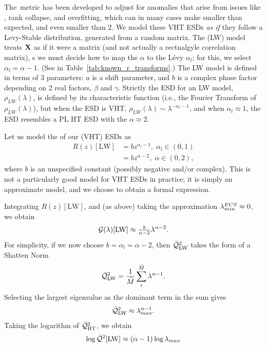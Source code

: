 The~\ALPHAHAT metric has been developed to adjust for \SCALE anomalies that arise from issues like \CorrelationTraps,
rank collapse, and overfitting, which can in many cases make \ALPHA smaller than expected, and even smaller than $2$.
We model these VHT ESDs \emph{as if} they follow a Levy-Stable distribution, generated from a \LevyWigner random matrix.
The \LevyWigner (LW) model treats $\mathbf{X}$ as if it were a \Wigner matrix (and not actually a rectnalgyle correlation  matrix),
s we must decide how to map the \HTSR $\alpha$ to the L\'evy $\alpha_{l}$; for this, we select $\alpha_{l}=\alpha-1$.
(See in Table~\ref{tab:known_r_transforms}.)
The LW model is defined in terms of 3 parameters:
$a$ is a shift parameter, and $b$ is a complex phase factor depending on 2 real factors, $\beta$ and $\gamma$.
Strictly the ESD for an LW model, $\rho_{LW}(\lambda)$, is defined by its characteristic function (i.e., the Fourier Transform of $\rho_{LW}(\lambda)$), but when the ESD is VHT, $\rho_{LW}(\lambda)\sim\lambda^{-\alpha_{l}-1}$, and when $\alpha_{l}\approx 1$, the ESD resembles a PL HT ESD with the \HTSR $\alpha\approx 2$.

Let us model the \RTransform of our \VeryHeavyTailed (VHT) ESDs as
\begin{align}
\label{eqn:LW_model_0} 
R(z)[\mathrm{LW}] & = bz^{\alpha_{l}-1},\;\alpha_{l}\in(0,1) \\ \nonumber
  & = bz^{\alpha-2},\;\alpha\in(0,2),
\end{align}
where $b$ is an unspecified constant (possibly negative and/or complex).
This is not a particularly good model for VHT ESDs in practice; it is simply an approximate model, and
we choose to obtain a formal expression.

Integrating $R(z)[\mathrm{LW}]$, and (as above) taking the approximation $\lambda^{ECS}_{min}\approx 0$, we obtain 
\begin{equation}
\label{eqn:LW_model_1} 
\mathcal{G(\lambda)}[\mathrm{LW}] \approx \tfrac{b}{\alpha-2} \lambda^{\alpha-2}  .
\end{equation}
%
For simplicity, if we now choose $b=\alpha_{l}=\alpha-2$, then $\bar{\mathcal{Q}}^{2}_{\mathrm{LW}}$ takes the form of a Shatten Norm
\begin{equation}
  \label{eqn:LW_model_2}
  \bar{\mathcal{Q}}^{2}_{\mathrm{LW}} = \frac{1}{\tilde{M}}\sum_{i}^{\tilde{M}}\lambda^{\alpha-1}  .
\end{equation}
%
Selecting the largest eigenvalue as the dominant term in the sum gives
\begin{equation}
\label{eqn:LW_model_2max}
  \bar{\mathcal{Q}}^{2}_{\mathrm{LW}} \approx \lambda_{max}^{\alpha-1}  .
\end{equation}
Taking the logarithm of $\bar{\mathcal{Q}}^{2}_{\mathrm{HT}} $, we obtain 
\begin{equation}
\label{eqn:LW_model_3} 
\log \bar{\mathcal{Q}}^{2}[\mathrm{LW}] \approx (\alpha-1)\log\lambda_{max}
\end{equation}

